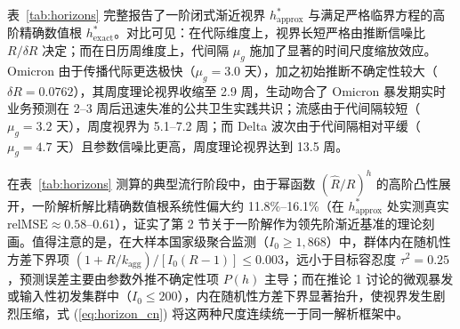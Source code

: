 \documentclass[11pt,a4paper]{article}
\theoremstyle{plain}
\theoremstyle{definition}
\begin{document}
表~\ref{tab:horizons} 完整报告了一阶闭式渐近视界 $h^*_{\text{approx}}$ 与满足严格临界方程的高阶精确数值根 $h^*_{\text{exact}}$。对比可见：在代际维度上，视界长短严格由推断信噪比 $R/\delta R$ 决定；而在日历周维度上，代间隔 $\mu_g$ 施加了显著的时间尺度缩放效应。Omicron 由于传播代际更迭极快（$\mu_g = 3.0$ 天），加之初始推断不确定性较大（$\delta R = 0.0762$），其周度理论视界收缩至 2.9 周，生动吻合了 Omicron 暴发期实时业务预测在 2--3 周后迅速失准的公共卫生实践共识；流感由于代间隔较短（$\mu_g = 3.2$ 天），周度视界为 5.1--7.2 周；而 Delta 波次由于代间隔相对平缓（$\mu_g = 4.7$ 天）且参数信噪比更高，周度理论视界达到 13.5 周。

在表~\ref{tab:horizons} 测算的典型流行阶段中，由于幂函数 $(\hat{R}/R)^h$ 的高阶凸性展开，一阶解析解比精确数值根系统性偏大约 11.8\%--16.1\%（在 $h^*_{\text{approx}}$ 处实测真实 $\text{relMSE} \approx 0.58\text{--}0.61$），证实了第 2 节关于一阶解作为领先阶渐近基准的理论刻画。值得注意的是，在大样本国家级聚合监测（$I_0 \ge 1,868$）中，群体内在随机性方差下界项 $(1+R/k_{\text{agg}})/[I_0(R-1)] \le 0.003$，远小于目标容忍度 $\tau^2 = 0.25$，预测误差主要由参数外推不确定性项 $P(h)$ 主导；而在推论 1 讨论的微观暴发或输入性初发集群中（$I_0 \le 200$），内在随机性方差下界显著抬升，使视界发生剧烈压缩，式 (\ref{eq:horizon_cn}) 将这两种尺度连续统一于同一解析框架中。
\end{document}
